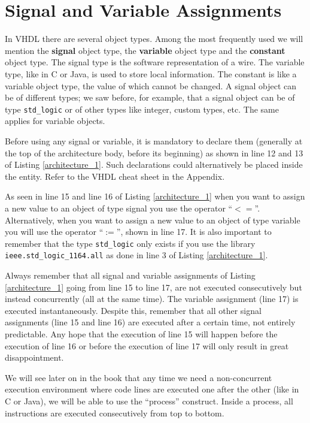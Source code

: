 \section{Signal and Variable Assignments}
In VHDL there are several object types. Among the most frequently used we will mention the \textbf{signal} object type, the \textbf{variable} object type and the \textbf{constant} object type. The signal type is the software representation of a wire. The variable type, like in C or Java, is used to store local information. The constant is like a variable object type, the value of which cannot be changed. A signal object can be of different types; we saw before, for example, that a signal object can be of type \texttt{std\_logic} or of other types like integer, custom types, etc. The same applies for variable objects.

Before using any signal or variable, it is mandatory to declare them (generally at the top of the architecture body, before its beginning) as shown in line 12 and 13 of Listing \ref{architecture_1}. Such declarations could alternatively be placed inside the entity. Refer to the VHDL cheat sheet in the Appendix.

As seen in line 15 and line 16 of Listing \ref{architecture_1} when you want to assign a new value to an object of type signal you use the operator ``$<=$''. Alternatively, when you want to assign a new value to an object of type variable you will use the operator ``$:=$'', shown in line 17. It is also important to remember that the type \texttt{std\_logic} only exists if you use the library \texttt{ieee.std\_logic\_1164.all} as done in line 3 of Listing \ref{architecture_1}.

Always remember that all signal and variable assignments of Listing \ref{architecture_1} going from line 15 to line 17, are not executed consecutively but instead concurrently (all at the same time). The variable assignment (line 17) is executed instantaneously. Despite this, remember that all other signal assignments (line 15 and line 16) are executed after a certain time, not entirely predictable. Any hope that the execution of line 15 will happen before the execution of line 16 or before the execution of line 17 will only result in great disappointment. 

We will see later on in the book that any time we need a non-concurrent execution environment where code lines are executed one after the other (like in C or Java), we will be able to use the ``process'' construct. Inside a process, all instructions are executed consecutively from top to bottom.

